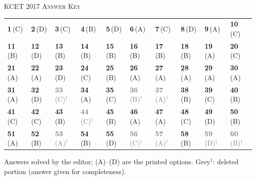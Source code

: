 \par{}\vspace{14pt}
\begin{center}{}\par
{\large\color{navy}\scshape KCET 2017 \textperiodcentered{} Answer Key}\end{center}
{\small\setlength{\tabcolsep}{1pt}\renewcommand{\arraystretch}{1.5}
\begin{tabularx}{\linewidth}{@{}*{10}{>{\centering\arraybackslash}X}@{}}\toprule
\textbf{1}\,(C) & \textbf{2}\,(D) & \textbf{3}\,(C) & \textbf{4}\,(B) & \textbf{5}\,(D) & \textbf{6}\,(A) & \textbf{7}\,(C) & \textbf{8}\,(D) & \textbf{9}\,(A) & \textbf{10}\,(C)\\
\textbf{11}\,(B) & \textbf{12}\,(D) & \textbf{13}\,(B) & \textbf{14}\,(B) & \textbf{15}\,(B) & \textbf{16}\,(B) & \textbf{17}\,(B) & \textbf{18}\,(B) & \textbf{19}\,(A) & \textbf{20}\,(C)\\
\textbf{21}\,(A) & \textbf{22}\,(A) & \textbf{23}\,(D) & \textbf{24}\,(C) & \textbf{25}\,(B) & \textbf{26}\,(A) & \textbf{27}\,(A) & \textbf{28}\,(A) & \textbf{29}\,(A) & \textbf{30}\,(A)\\
\textbf{31}\,(A) & \textbf{32}\,(D) & \textcolor{gray}{\textbf{33}\,(C)$^{\dagger}$} & \textbf{34}\,(A) & \textbf{35}\,(C) & \textcolor{gray}{\textbf{36}\,(B)$^{\dagger}$} & \textcolor{gray}{\textbf{37}\,(A)$^{\dagger}$} & \textbf{38}\,(B) & \textbf{39}\,(C) & \textbf{40}\,(B)\\
\textbf{41}\,(C) & \textbf{42}\,(C) & \textbf{43}\,(B) & \textcolor{gray}{\textbf{44}\,(C)$^{\dagger}$} & \textbf{45}\,(B) & \textbf{46}\,(A) & \textbf{47}\,(A) & \textbf{48}\,(C) & \textbf{49}\,(D) & \textbf{50}\,(B)\\
\textbf{51}\,(A) & \textbf{52}\,(B) & \textcolor{gray}{\textbf{53}\,(A)$^{\dagger}$} & \textbf{54}\,(B) & \textbf{55}\,(D) & \textcolor{gray}{\textbf{56}\,(C)$^{\dagger}$} & \textcolor{gray}{\textbf{57}\,(A)$^{\dagger}$} & \textbf{58}\,(B) & \textcolor{gray}{\textbf{59}\,(D)$^{\dagger}$} & \textcolor{gray}{\textbf{60}\,(B)$^{\dagger}$}\\\bottomrule\end{tabularx}}\par\smallskip
{\footnotesize Answers solved by the editor; (A)--(D) are the printed options. {\color{gray}Grey$^{\dagger}$}: deleted portion (answer given for completeness).\par
}\par
\clearpage
